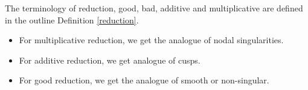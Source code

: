 \documentclass{article}
\theoremstyle{definition}
\newtheorem{definition}{Definition}[section]
\theoremstyle{definition}
\theoremstyle{definition}
\begin{document}

The terminology of reduction, good, bad, additive and multiplicative are defined in the outline Definition \ref{reduction}.

\begin{itemize}
    \item For  multiplicative reduction, we get the analogue of nodal singularities.
    \item For additive reduction, we get analogue of  cusps.
    \item For good reduction, we get the analogue of smooth or non-singular.
\end{itemize}
  
    
      
      




\end{document}
